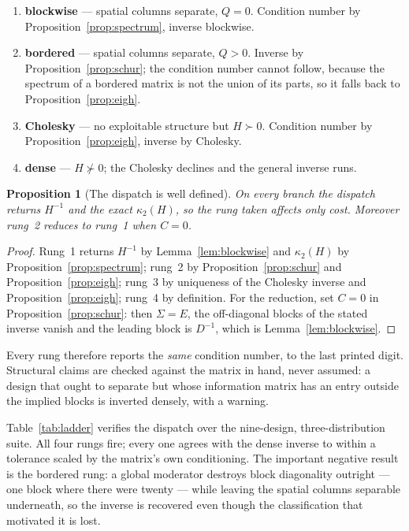 \documentclass[11pt,a4paper]{article}
\theoremstyle{plain}
\newtheorem{proposition}{Proposition}
\theoremstyle{definition}
\newcommand{\cond}{\kappa}
\begin{document}
\begin{enumerate}
  \item \textbf{blockwise} --- spatial columns separate, $Q=0$. Condition number by
        Proposition~\ref{prop:spectrum}, inverse blockwise.
  \item \textbf{bordered} --- spatial columns separate, $Q>0$. Inverse by
        Proposition~\ref{prop:schur}; the condition number cannot follow, because the spectrum of
        a bordered matrix is not the union of its parts, so it falls back to
        Proposition~\ref{prop:eigh}.
  \item \textbf{Cholesky} --- no exploitable structure but $H\succ0$. Condition number by
        Proposition~\ref{prop:eigh}, inverse by Cholesky.
  \item \textbf{dense} --- $H\not\succ0$; the Cholesky declines and the general inverse runs.
\end{enumerate}

\begin{proposition}[The dispatch is well defined]\label{prop:welldefined}
On every branch the dispatch returns $H^{-1}$ and the exact $\cond_2(H)$, so the rung taken
affects only cost. Moreover rung~2 reduces to rung~1 when $C = 0$.
\end{proposition}
\begin{proof}
Rung~1 returns $H^{-1}$ by Lemma~\ref{lem:blockwise} and $\cond_2(H)$ by
Proposition~\ref{prop:spectrum}; rung~2 by Proposition~\ref{prop:schur} and
Proposition~\ref{prop:eigh}; rung~3 by uniqueness of the Cholesky inverse and
Proposition~\ref{prop:eigh}; rung~4 by definition. For the reduction, set $C=0$ in
Proposition~\ref{prop:schur}: then $\Sigma = E$, the off-diagonal blocks of the stated inverse
vanish and the leading block is $D^{-1}$, which is Lemma~\ref{lem:blockwise}.
\end{proof}

Every rung therefore reports the \emph{same} condition number, to the last printed digit.
Structural claims are checked against the matrix in hand, never assumed: a design that ought to
separate but whose information matrix has an entry outside the implied blocks is inverted
densely, with a warning.

Table~\ref{tab:ladder} verifies the dispatch over the nine-design, three-distribution suite. All
four rungs fire; every one agrees with the dense inverse to within a tolerance scaled by the
matrix's own conditioning. The important negative result is the bordered rung: a global moderator
destroys block diagonality outright --- one block where there were twenty --- while leaving the
spatial columns separable underneath, so the inverse is recovered even though the classification
that motivated it is lost.
\end{document}
